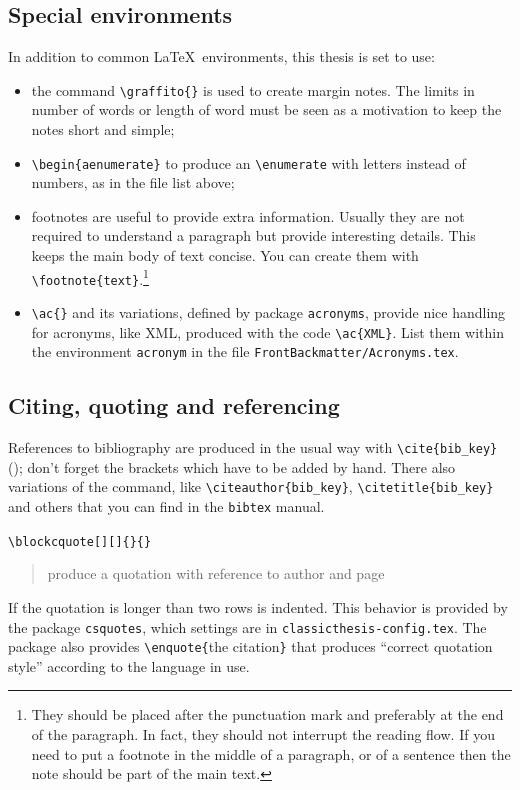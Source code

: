 \subsection{Special environments}\label{subsec:special_env}
In addition to common \LaTeX\ environments, this thesis is set to use:
\begin{itemize}
	\item the command \verb!\graffito{}! is used to create margin notes.
	The limits in number of words or length of word must be seen as a motivation to keep the notes short and simple;
	\item \verb!\begin{aenumerate}! to produce an \verb!\enumerate! with letters instead of numbers, as in the file list above;
	\item footnotes are useful to provide extra information. 
	Usually they are not required to understand a paragraph but provide interesting details. 
	This keeps the main body of text concise.
	You can create them with \verb!\footnote{text}!.\footnote{They should be placed after the punctuation mark and preferably at the end of the paragraph. In fact, they should not interrupt the reading flow. If you need to put a footnote in the middle of a paragraph, or of a sentence then the note should be part of the main text.}
	\item \verb!\ac{}! and its variations, defined by package \verb!acronyms!, provide nice handling for acronyms, like \ac{XML}, produced with the code \verb!\ac{XML}!.
	List them within the environment \verb!acronym! in the file \verb!FrontBackmatter/Acronyms.tex!.
\end{itemize}

\subsection{Citing, quoting and referencing}
References to bibliography are produced in the usual way with \verb!\cite{bib_key}! (\cite{bringhurst:2002}); don't forget the brackets which have to be added by hand.
There also variations of the command, like \verb!\citeauthor{bib_key}!, \verb!\citetitle{bib_key}! and others that you can find in the \verb!bibtex! manual.

\verb!\blockcquote[][]{}{}! \blockcquote[see][p. 111]{bringhurst:2002}{produce a quotation with reference to author and page}.
If the quotation is longer than two rows is indented.
This behavior is provided by the package \verb!csquotes!, which settings are in \verb!classicthesis-config.tex!. 
The package also provides \verb!\enquote{!the citation\verb!}! that produces \enquote{correct quotation style} according to the language in use.

